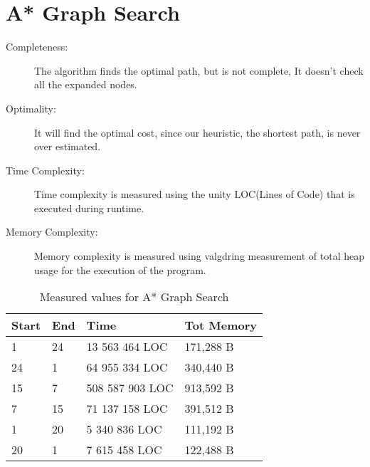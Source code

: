 \section{A* Graph Search}
\begin{description}
\item[Completeness:			]The algorithm finds the optimal path, but is not complete, It doesn't check all the expanded nodes.
\item[Optimality:				]It will find the optimal cost, since our heuristic,
	the shortest path, is never over estimated.
\item[Time Complexity:	]Time complexity is measured using the unity LOC(Lines
	of Code) that is executed during runtime.
\item[Memory Complexity:]	Memory complexity is measured using valgdring
	measurement of total heap usage for the execution of the program.
\end{description}

\begin{table}[h]
\centering
\begin{tabular}{	p{} p{} 
									p{} p{} }\hline
	Start & End & Time & Tot Memory \\\hline
	1		&	24 	& 13 563 464 LOC	&	171,288 B\\
	24	&	1 	& 64 955 334 LOC	&	340,440 B\\
	15	&	7 	& 508 587 903 LOC	&	913,592 B\\
	7		&	15 	& 71 137 158 LOC	&	391,512 B\\
	1		&	20 	& 5 340 836 LOC	&	111,192 B\\
	20	&	1		&	7 615 458 LOC	&	122,488 B\\
\end{tabular}
\caption{Measured values for A* Graph Search}\label{tbl:sumGraph}
\end{table}




